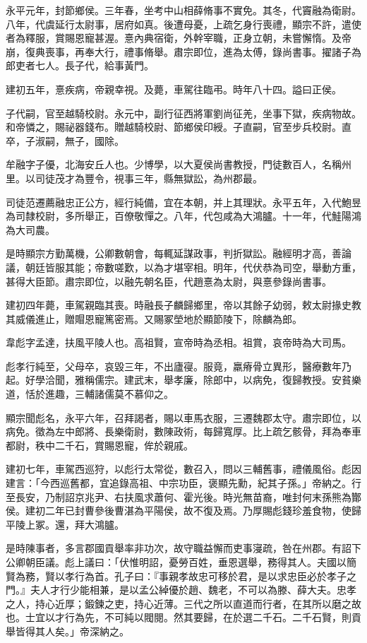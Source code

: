\begin{pinyinscope}
永平元年，封節鄉侯。三年春，坐考中山相薛脩事不實免。其冬，代竇融為衛尉。八年，代虞延行太尉事，居府如真。後遭母憂，上疏乞身行喪禮，顯宗不許，遣使者為釋服，賞賜恩寵甚渥。憙內典宿衛，外幹宰職，正身立朝，未嘗懈惰。及帝崩，復典喪事，再奉大行，禮事脩舉。肅宗即位，進為太傅，錄尚書事。擢諸子為郎吏者七人。長子代，給事黃門。

建初五年，憙疾病，帝親幸視。及薨，車駕往臨弔。時年八十四。謚曰正侯。

子代嗣，官至越騎校尉。永元中，副行征西將軍劉尚征羌，坐事下獄，疾病物故。和帝憐之，賜祕器錢布。贈越騎校尉、節鄉侯印綬。子直嗣，官至步兵校尉。直卒，子淑嗣，無子，國除。

牟融字子優，北海安丘人也。少博學，以大夏侯尚書教授，門徒數百人，名稱州里。以司徒茂才為豐令，視事三年，縣無獄訟，為州郡最。

司徒范遷薦融忠正公方，經行純備，宜在本朝，并上其理狀。永平五年，入代鮑昱為司隸校尉，多所舉正，百僚敬憚之。八年，代包咸為大鴻臚。十一年，代鮭陽鴻為大司農。

是時顯宗方勤萬機，公卿數朝會，每輒延謀政事，判折獄訟。融經明才高，善論議，朝廷皆服其能；帝數嗟歎，以為才堪宰相。明年，代伏恭為司空，舉動方重，甚得大臣節。肅宗即位，以融先朝名臣，代趙憙為太尉，與憙參錄尚書事。

建初四年薨，車駕親臨其喪。時融長子麟歸鄉里，帝以其餘子幼弱，敕太尉掾史教其威儀進止，贈賵恩寵篤密焉。又賜冢塋地於顯節陵下，除麟為郎。

韋彪字孟達，扶風平陵人也。高祖賢，宣帝時為丞相。祖賞，哀帝時為大司馬。

彪孝行純至，父母卒，哀毀三年，不出廬寑。服竟，羸瘠骨立異形，醫療數年乃起。好學洽聞，雅稱儒宗。建武末，舉孝廉，除郎中，以病免，復歸教授。安貧樂道，恬於進趣，三輔諸儒莫不慕仰之。

顯宗聞彪名，永平六年，召拜謁者，賜以車馬衣服，三遷魏郡太守。肅宗即位，以病免。徵為左中郎將、長樂衛尉，數陳政術，每歸寬厚。比上疏乞骸骨，拜為奉車都尉，秩中二千石，賞賜恩寵，侔於親戚。

建初七年，車駕西巡狩，以彪行太常從，數召入，問以三輔舊事，禮儀風俗。彪因建言：「今西巡舊都，宜追錄高祖、中宗功臣，褒顯先勳，紀其子孫。」帝納之。行至長安，乃制詔京兆尹、右扶風求蕭何、霍光後。時光無苗裔，唯封何末孫熊為酇侯。建初二年已封曹參後曹湛為平陽侯，故不復及焉。乃厚賜彪錢珍羞食物，使歸平陵上冢。還，拜大鴻臚。

是時陳事者，多言郡國貢舉率非功次，故守職益懈而吏事寖疏，咎在州郡。有詔下公卿朝臣議。彪上議曰：「伏惟明詔，憂勞百姓，垂恩選舉，務得其人。夫國以簡賢為務，賢以孝行為首。孔子曰：『事親孝故忠可移於君，是以求忠臣必於孝子之門。』夫人才行少能相兼，是以孟公綽優於趙、魏老，不可以為滕、薛大夫。忠孝之人，持心近厚；鍛鍊之吏，持心近薄。三代之所以直道而行者，在其所以磨之故也。士宜以才行為先，不可純以閥閱。然其要歸，在於選二千石。二千石賢，則貢舉皆得其人矣。」帝深納之。


\end{pinyinscope}
